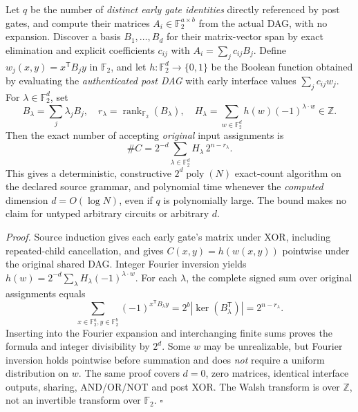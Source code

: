 \documentclass[11pt]{article}
\begin{document}
Let $q$ be the number of \emph{distinct early gate identities} directly referenced by post gates, and compute their matrices $A_i\in\mathbb F_2^{a\times b}$ from the actual DAG, with no expansion. Discover a basis $B_1,\dots,B_d$ for their matrix-vector span by exact elimination and explicit coefficients $c_{ij}$ with $A_i=\sum_jc_{ij}B_j$. Define $w_j(x,y)=x^{\mathsf T}B_jy$ in $\mathbb F_2$, and let $h:\mathbb F_2^d\to\{0,1\}$ be the Boolean function obtained by evaluating the \emph{authenticated post DAG} with early interface values $\sum_jc_{ij}w_j$. For $\lambda\in\mathbb F_2^d$, set
\[
B_\lambda=\sum_j\lambda_jB_j,\quad
r_\lambda=\operatorname{rank}_{\mathbb F_2}(B_\lambda),\quad
H_\lambda=\sum_{w\in\mathbb F_2^d}h(w)(-1)^{\lambda\cdot w}\in\mathbb Z.
\]
Then the exact number of accepting \emph{original} input assignments is
\[
\boxed{\#C=2^{-d}\sum_{\lambda\in\mathbb F_2^d}H_\lambda\,2^{n-r_\lambda}.}
\]
This gives a deterministic, constructive $2^d\operatorname{poly}(N)$ exact-count algorithm on the declared source grammar, and polynomial time whenever the \emph{computed} dimension $d=O(\log N)$, even if $q$ is polynomially large. The bound makes no claim for untyped arbitrary circuits or arbitrary $d$.

\emph{Proof.} Source induction gives each early gate's matrix under XOR, including repeated-child cancellation, and gives $C(x,y)=h(w(x,y))$ pointwise under the original shared DAG. Integer Fourier inversion yields
$h(w)=2^{-d}\sum_\lambda H_\lambda(-1)^{\lambda\cdot w}$.
For each $\lambda$, the complete signed sum over original assignments equals
\[
\sum_{x\in\mathbb F_2^a,y\in\mathbb F_2^b}(-1)^{x^{\mathsf T}B_\lambda y}
=2^b|\ker(B_\lambda^{\mathsf T})|=2^{n-r_\lambda}.
\]
Inserting into the Fourier expansion and interchanging finite sums proves the formula and integer divisibility by $2^d$. Some $w$ may be unrealizable, but Fourier inversion holds pointwise before summation and does \emph{not} require a uniform distribution on $w$. The same proof covers $d=0$, zero matrices, identical interface outputs, sharing, AND/OR/NOT and post XOR. The Walsh transform is over $\mathbb Z$, not an invertible transform over $\mathbb F_2$. \hfill$\square$
\end{document}
